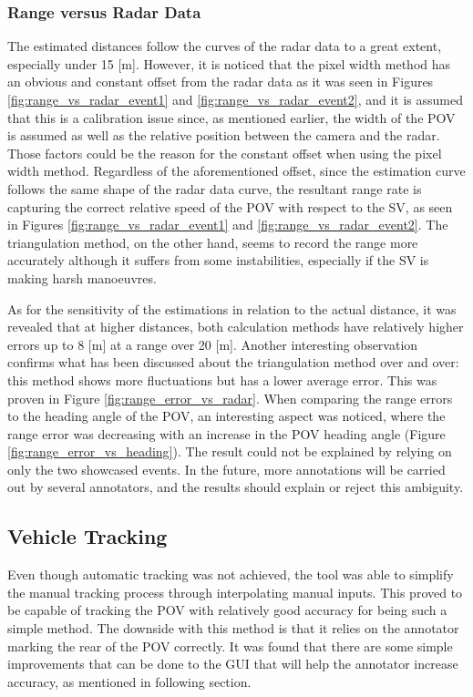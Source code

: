 \subsubsection{Range versus Radar Data}
The estimated distances follow the curves of the radar data to a great extent, especially under 15 [m]. However, it is noticed that the pixel width method has an obvious and constant offset from the radar data as it was seen in Figures \ref{fig:range_vs_radar_event1} and \ref{fig:range_vs_radar_event2}, and it is assumed that this is a calibration issue since, as mentioned earlier, the width of the POV is assumed as well as the relative position between the camera and the radar. Those factors could be the reason for the constant offset when using the pixel width method. Regardless of the aforementioned offset, since the estimation curve follows the same shape of the radar data curve, the resultant range rate is capturing the correct relative speed of the POV with respect to the SV, as seen in Figures \ref{fig:range_vs_radar_event1} and \ref{fig:range_vs_radar_event2}. The triangulation method, on the other hand, seems to record the range more accurately although it suffers from some instabilities, especially if the SV is making harsh manoeuvres.

As for the sensitivity of the estimations in relation to the actual distance, it was revealed that at higher distances, both calculation methods have relatively higher errors up to 8 [m] at a range over 20 [m]. Another interesting observation confirms what has been discussed about the triangulation method over and over: this method shows more fluctuations but has a lower average error. This was proven in Figure \ref{fig:range_error_vs_radar}. When comparing the range errors to the heading angle of the POV, an interesting aspect was noticed, where the range error was decreasing with an increase in the POV heading angle (Figure \ref{fig:range_error_vs_heading}). The result could not be explained by relying on only the two showcased events. In the future, more annotations will be carried out by several annotators, and the results should explain or reject this ambiguity.

\subsection{Vehicle Tracking}
Even though automatic tracking was not achieved, the tool was able to simplify the manual tracking process through interpolating manual inputs. This proved to be capable of tracking the POV with relatively good accuracy for being such a simple method. The downside with this method is that it relies on the annotator marking the rear of the POV correctly. It was found that there are some simple improvements that can be done to the GUI that will help the annotator increase accuracy, as mentioned in following section. 

